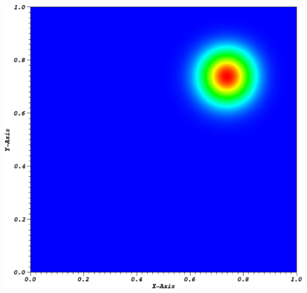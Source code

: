 \documentclass[compress,10pt]{beamer}
\begin{document}
\begin{frame}[t]
\begin{columns}
{}\includegraphics[width=0.70\columnwidth]{images/ME2_cart_Irr=1_tol=0.1_cyc08_sol.eps}
\end{columns}
\end{frame}
\end{document}
